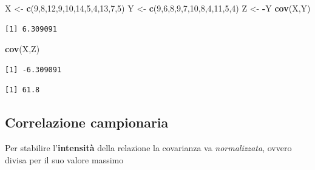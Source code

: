 \documentclass[
  a4paper,
  DIV=11,
  numbers=noendperiod]{scrreprt}
\newenvironment{Shaded}{\begin{snugshade}}{\end{snugshade}}
\newcommand{\DecValTok}[1]{\textcolor[rgb]{0.00,0.00,0.81}{#1}}
\newcommand{\FunctionTok}[1]{\textcolor[rgb]{0.13,0.29,0.53}{\textbf{#1}}}
\newcommand{\NormalTok}[1]{#1}
\newcommand{\OtherTok}[1]{\textcolor[rgb]{0.56,0.35,0.01}{#1}}
\newcommand{\SpecialCharTok}[1]{\textcolor[rgb]{0.81,0.36,0.00}{\textbf{#1}}}
\begin{document}
\begin{Shaded}
\begin{Highlighting}[]
\NormalTok{X }\OtherTok{\textless{}{-}} \FunctionTok{c}\NormalTok{(}\DecValTok{9}\NormalTok{,}\DecValTok{8}\NormalTok{,}\DecValTok{12}\NormalTok{,}\DecValTok{9}\NormalTok{,}\DecValTok{10}\NormalTok{,}\DecValTok{14}\NormalTok{,}\DecValTok{5}\NormalTok{,}\DecValTok{4}\NormalTok{,}\DecValTok{13}\NormalTok{,}\DecValTok{7}\NormalTok{,}\DecValTok{5}\NormalTok{)}
\NormalTok{Y }\OtherTok{\textless{}{-}} \FunctionTok{c}\NormalTok{(}\DecValTok{9}\NormalTok{,}\DecValTok{6}\NormalTok{,}\DecValTok{8}\NormalTok{,}\DecValTok{9}\NormalTok{,}\DecValTok{7}\NormalTok{,}\DecValTok{10}\NormalTok{,}\DecValTok{8}\NormalTok{,}\DecValTok{4}\NormalTok{,}\DecValTok{11}\NormalTok{,}\DecValTok{5}\NormalTok{,}\DecValTok{4}\NormalTok{)}
\NormalTok{Z }\OtherTok{\textless{}{-}} \SpecialCharTok{{-}}\NormalTok{Y}
\FunctionTok{cov}\NormalTok{(X,Y)}
\end{Highlighting}
\end{Shaded}

\begin{verbatim}
[1] 6.309091
\end{verbatim}

\begin{Shaded}
\begin{Highlighting}[]
\FunctionTok{cov}\NormalTok{(X,Z)}
\end{Highlighting}
\end{Shaded}

\begin{verbatim}
[1] -6.309091
\end{verbatim}

\begin{Shaded}
\end{Shaded}

\begin{verbatim}
[1] 61.8
\end{verbatim}

\subsection{Correlazione campionaria}\label{correlazione-campionaria}

Per stabilire l'\textbf{intensità} della relazione la covarianza va
\emph{normalizzata}, ovvero divisa per il suo valore massimo
\end{document}
